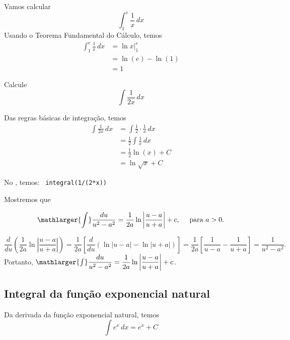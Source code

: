 \cleardoublepage\documentclass[../main.tex]{subfiles}
\begin{document}
\begin{ex}
  Vamos calcular
  \begin{equation*}
    \int_1^e \frac{1}{x}\,dx
  \end{equation*}
  Usando o Teorema Fundamental do Cálculo, temos
  \begin{align*}
    \int_1^e \frac{1}{x}\,dx &= \left. \ln x\right|_1^e \\
                             &= \ln(e) - \ln(1) \\
                             &= 1
  \end{align*}
\end{ex}
\begin{ex}
  Calcule
  \begin{equation*}
    \int \frac{1}{2x}\,dx
  \end{equation*}
  \begin{resol}
  Das regras básicas de integração, temos
  \begin{align*}
    \int \frac{1}{2x}\,dx &= \int \frac{1}{2}\cdot\frac{1}{x}\,dx \\
                          &= \frac{1}{2}\int\frac{1}{x}\,dx \\
                          &= \frac{1}{2}\ln(x) + C \\
                          &= \ln\sqrt{x} + C
  \end{align*}

No \geogebra, temos: \verb| integral(1/(2*x))|
\end{resol}
\end{ex}

\begin{ex}\label{ExDem:tInt-du/(u^2-a^2)}
Mostremos que

\[ \mathlarger{\int} \dfrac{du}{u^2-a^2} = \dfrac{1}{2a}\ln \left|\dfrac{u-a}{u+a} \right| +c, \quad \mbox{ para }a>0. \]

\begin{solution}
\[ \dfrac{d}{du}\left( \dfrac{1}{2a}\ln \left|\dfrac{u-a}{u+a} \right| \right)=\dfrac{1}{2a}\left[\dfrac{d}{du}( \ln |u-a|-\ln |u+a|) \right]= \dfrac{1}{2a}\left[\dfrac{1}{u-a}-\dfrac{1}{u+a} \right]=\dfrac{1}{u^2-a^2}. \]
Portanto, \(\mathlarger{\int} \dfrac{du}{u^2-a^2} = \dfrac{1}{2a}\ln \left|\dfrac{u-a}{u+a} \right| +c\).
\end{solution}
\end{ex}
\subsection{Integral da função exponencial natural}\hypertarget{IntExp}{}\label{subsec:Int_e^x}
Da derivada da função exponencial natural, temos
\begin{equation}
  \int e^x\,dx = e^x + C
\end{equation}
\end{document}
